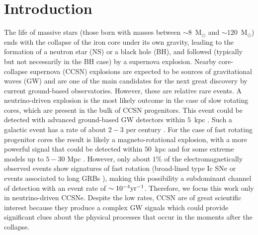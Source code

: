 
\section{Introduction}


The life of massive stars {(those born with masses between $\sim 8$~M$_\odot$ and $\sim 120$~M$_\odot$)} ends with the collapse of {the} iron core under {its} own gravity, leading {to} the formation of a neutron star {(NS)} or a black hole (BH), {and} followed (typically but not necessarily in the BH case) by {a supernova} explosion. {Nearby} core-collapse supernova (CCSN) explosions {are expected to be sources of gravitational waves (GW) and are one of the main candidates for the next great discovery by current ground-based observatories. However, these are relative rare events. A neutrino-driven explosion \citep{Bethe:1990} is the most likely outcome in the case of slow rotating cores, which are present in the bulk of CCSN progenitors. This event could be detected with advanced ground-based GW detectors within $5$~kpc \citep{Gossan:2016,TargetedSNSearchO12}. Such a galactic event has a rate of about $2-3$ per century \citep{Adams:2013,Rozwadowska:2021}. For the case of fast rotating progenitor cores the result is likely a magneto-rotational explosion, with } a more powerful signal {that could} be detected {within $50$~kpc and for some extreme models 
up to $5-30$ Mpc \cite{Gossan:2016,TargetedSNSearchO12}. However, only about $1\%$ of the electromagnetically observed events show signatures of fast rotation (broad-lined type Ic SNe \citep{Li:2011b} or events associated to long GRBs 
\citep{Chapman:2007}), making this possibility a subdominant channel of detection with an event rate of $\sim 10^{-4} \rm{yr}^{-1}$. Therefore, we focus this work only in neutrino-driven CCSNe. 
Despite the low rates, CCSN are of great scientific interest because they produce} a complex GW signals which could provide significant clues about the physical processes that occur in the moments after the collapse. 

